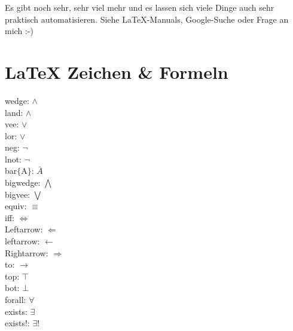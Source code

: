 Es gibt noch sehr, sehr viel mehr und es lassen sich viele Dinge auch sehr praktisch automatisieren. Siehe LaTeX-Manuals, Google-Suche oder Frage an mich :-)

\section{LaTeX Zeichen \& Formeln}
wedge: $\wedge$\\
land: $\land$\\
vee: $\vee$\\
lor: $\lor$\\
neg: $\neg$\\
lnot: $\lnot$\\
bar$\lbrace$A$\rbrace$: $\bar{A}$\\
bigwedge: $\bigwedge$\\
bigvee: $\bigvee$\\
equiv: $\equiv$\\
iff: $\iff$\\
Leftarrow: $\Leftarrow$\\
leftarrow: $\leftarrow$\\
Rightarrow: $\Rightarrow$\\
to: $\to$\\
top: $\top$\\
bot: $\bot$\\
forall: $\forall$\\
exists: $\exists$\\
exists!: $\exists!$\\
